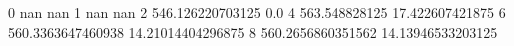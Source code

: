 0 nan nan
1 nan nan
2 546.126220703125 0.0
4 563.548828125 17.422607421875
6 560.3363647460938 14.21014404296875
8 560.2656860351562 14.13946533203125
